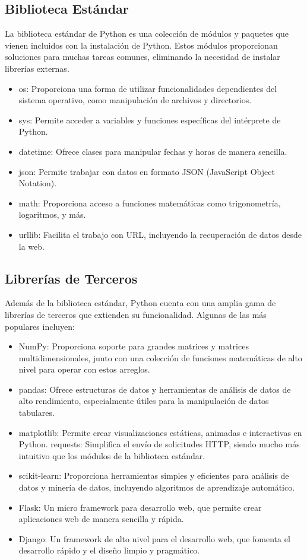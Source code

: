 \documentclass[10pt,a4paper]{article}
\begin{document}
\subsection{Biblioteca Estándar}
La biblioteca estándar de Python es una colección de módulos y paquetes que vienen incluidos con la instalación de Python. Estos módulos proporcionan soluciones para muchas tareas comunes, eliminando la necesidad de instalar librerías externas.
\begin{itemize}
\item os: Proporciona una forma de utilizar funcionalidades dependientes del sistema operativo, como manipulación de archivos y directorios.
\item sys: Permite acceder a variables y funciones específicas del intérprete de Python.
\item datetime: Ofrece clases para manipular fechas y horas de manera sencilla.
\item json: Permite trabajar con datos en formato JSON (JavaScript Object Notation).
\item math: Proporciona acceso a funciones matemáticas como trigonometría, logaritmos, y más.
\item urllib: Facilita el trabajo con URL, incluyendo la recuperación de datos desde la web.
\end{itemize}
\subsection{Librerías de Terceros}
Además de la biblioteca estándar, Python cuenta con una amplia gama de librerías de terceros que extienden su funcionalidad. Algunas de las más populares incluyen:
\begin{itemize}


    \item NumPy: Proporciona soporte para grandes matrices y matrices multidimensionales, junto con una colección de funciones matemáticas de alto nivel para operar con estos arreglos.
    \item pandas: Ofrece estructuras de datos y herramientas de análisis de datos de alto rendimiento, especialmente útiles para la manipulación de datos tabulares.
    \item matplotlib: Permite crear visualizaciones estáticas, animadas e interactivas en Python.
requests: Simplifica el envío de solicitudes HTTP, siendo mucho más intuitivo que los módulos de la biblioteca estándar.
    \item scikit-learn: Proporciona herramientas simples y eficientes para análisis de datos y minería de datos, incluyendo algoritmos de aprendizaje automático.
    \item Flask: Un micro framework para desarrollo web, que permite crear aplicaciones web de manera sencilla y rápida.
    \item Django: Un framework de alto nivel para el desarrollo web, que fomenta el desarrollo rápido y el diseño limpio y pragmático.
\end{itemize}
\newpage
\end{document}

